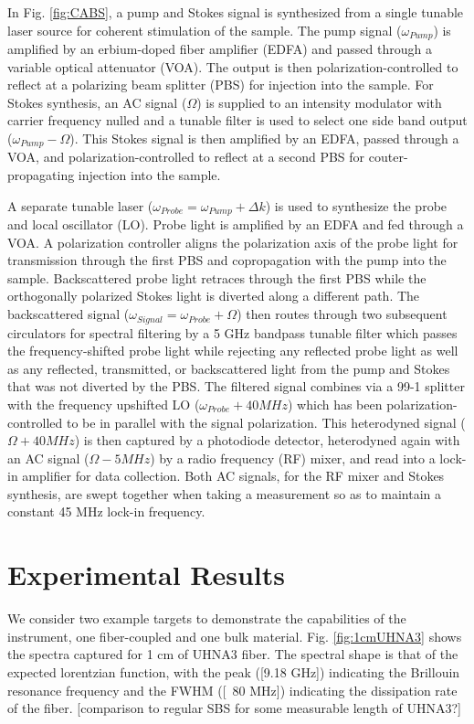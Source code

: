 \documentclass[
sn-nature,
twocolumn
]{sn-jnl}%
\begin{document}
In Fig. \ref{fig:CABS}, a pump and Stokes signal is synthesized from a single tunable laser source for coherent stimulation of the sample. The pump signal ($\omega_{Pump}$) is amplified by an erbium-doped fiber amplifier (EDFA) and passed through a variable optical attenuator (VOA). The output is then polarization-controlled to reflect at a polarizing beam splitter (PBS) for injection into the sample. For Stokes synthesis, an AC signal ($\Omega$) is supplied to an intensity modulator with carrier frequency nulled and a tunable filter is used to select one side band output ($\omega_{Pump} - \Omega$). This Stokes signal is then amplified by an EDFA, passed through a VOA, and polarization-controlled to reflect at a second PBS for couter-propagating injection into the sample.

A separate tunable laser ($\omega_{Probe} = \omega_{Pump} + \Delta k$) is used to synthesize the probe and local oscillator (LO). Probe light is amplified by an EDFA and fed through a VOA. A polarization controller aligns the polarization axis of the probe light for transmission through the first PBS and copropagation with the pump into the sample. Backscattered probe light retraces through the first PBS while the orthogonally polarized Stokes light is diverted along a different path. The backscattered signal ($\omega_{Signal} = \omega_{Probe} + \Omega$) then routes through two subsequent circulators for spectral filtering by a 5 GHz bandpass tunable filter which passes the frequency-shifted probe light while rejecting any reflected probe light as well as any reflected, transmitted, or backscattered light from the pump and Stokes that was not diverted by the PBS. The filtered signal combines via a 99-1 splitter with the frequency upshifted LO ($\omega_{Probe} + 40 MHz$) which has been polarization-controlled to be in parallel with the signal polarization. This heterodyned signal ($\Omega + 40 MHz$) is then captured by a photodiode detector, heterodyned again with an AC signal ($\Omega - 5 MHz$) by a radio frequency (RF) mixer, and read into a lock-in amplifier for data collection. Both AC signals, for the RF mixer and Stokes synthesis, are swept together when taking a measurement so as to maintain a constant 45 MHz lock-in frequency.


\section{Experimental Results}\label{Experimental Results}

We consider two example targets to demonstrate the capabilities of the instrument, one fiber-coupled and one bulk material. Fig. \ref{fig:1cmUHNA3} shows the spectra captured for 1 cm of UHNA3 fiber. The spectral shape is that of the expected lorentzian function, with the peak ([9.18 GHz]) indicating the Brillouin resonance frequency and the FWHM ([~80 MHz]) indicating the dissipation rate of the fiber. [comparison to regular SBS for some measurable length of UHNA3?]
\end{document}
